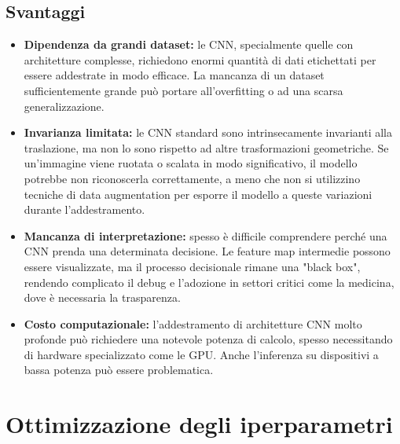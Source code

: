 \documentclass[a4paper,12pt]{report}
\begin{document}
	\section{Svantaggi}
	
	\begin{itemize}
		\item \textbf{Dipendenza da grandi dataset:} le CNN, specialmente quelle con architetture complesse, richiedono enormi quantità di dati etichettati per essere addestrate in modo efficace. La mancanza di un dataset sufficientemente grande può portare all'overfitting o ad una scarsa generalizzazione.
		\item \textbf{Invarianza limitata:} le CNN standard sono intrinsecamente invarianti alla traslazione, ma non lo sono rispetto ad altre trasformazioni geometriche. Se un'immagine viene ruotata o scalata in modo significativo, il modello potrebbe non riconoscerla correttamente, a meno che non si utilizzino tecniche di data augmentation per esporre il modello a queste variazioni durante l'addestramento.
		\item \textbf{Mancanza di interpretazione:} spesso è difficile comprendere perché una CNN prenda una determinata decisione. Le feature map intermedie possono essere visualizzate, ma il processo decisionale rimane una "black box", rendendo complicato il debug e l'adozione in settori critici come la medicina, dove è necessaria la trasparenza.
		\item \textbf{Costo computazionale:} l'addestramento di architetture CNN molto profonde può richiedere una notevole potenza di calcolo, spesso necessitando di hardware specializzato come le GPU. Anche l'inferenza su dispositivi a bassa potenza può essere problematica.
	\end{itemize}
	
	\chapter{Ottimizzazione degli iperparametri}
	
\end{document}
